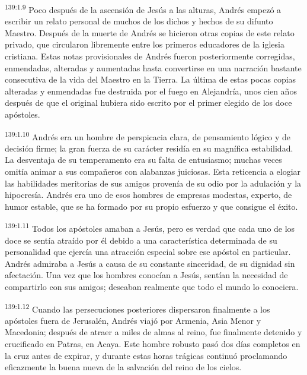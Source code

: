 \par 
\textsuperscript{139:1.9} Poco después de la ascensión de Jesús a las alturas, Andrés empezó a escribir un relato personal de muchos de los dichos y hechos de su difunto Maestro. Después de la muerte de Andrés se hicieron otras copias de este relato privado, que circularon libremente entre los primeros educadores de la iglesia cristiana. Estas notas provisionales de Andrés fueron posteriormente corregidas, enmendadas, alteradas y aumentadas hasta convertirse en una narración bastante consecutiva de la vida del Maestro en la Tierra. La última de estas pocas copias alteradas y enmendadas fue destruida por el fuego en Alejandría, unos cien años después de que el original hubiera sido escrito por el primer elegido de los doce apóstoles.

\par 
\textsuperscript{139:1.10} Andrés era un hombre de perspicacia clara, de pensamiento lógico y de decisión firme; la gran fuerza de su carácter residía en su magnífica estabilidad. La desventaja de su temperamento era su falta de entusiasmo; muchas veces omitía animar a sus compañeros con alabanzas juiciosas. Esta reticencia a elogiar las habilidades meritorias de sus amigos provenía de su odio por la adulación y la hipocresía. Andrés era uno de esos hombres de empresas modestas, experto, de humor estable, que se ha formado por su propio esfuerzo y que consigue el éxito.

\par 
\textsuperscript{139:1.11} Todos los apóstoles amaban a Jesús, pero es verdad que cada uno de los doce se sentía atraído por él debido a una característica determinada de su personalidad que ejercía una atracción especial sobre ese apóstol en particular. Andrés admiraba a Jesús a causa de su constante sinceridad, de su dignidad sin afectación. Una vez que los hombres conocían a Jesús, sentían la necesidad de compartirlo con sus amigos; deseaban realmente que todo el mundo lo conociera.

\par 
\textsuperscript{139:1.12} Cuando las persecuciones posteriores dispersaron finalmente a los apóstoles fuera de Jerusalén, Andrés viajó por Armenia, Asia Menor y Macedonia; después de atraer a miles de almas al reino, fue finalmente detenido y crucificado en Patras, en Acaya. Este hombre robusto pasó dos días completos en la cruz antes de expirar, y durante estas horas trágicas continuó proclamando eficazmente la buena nueva de la salvación del reino de los cielos.

